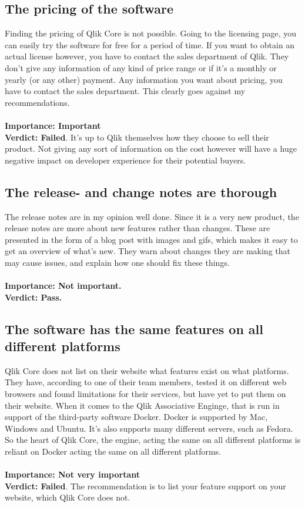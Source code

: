 \documentclass{cslthse-msc}
\begin{document}
    \subsection{The pricing of the software}
    Finding the pricing of Qlik Core is not possible. Going to the licensing page, you can easily try the software for free for a period of time. If you want to obtain an actual license however, you have to contact the sales department of Qlik. They don't give any information of any kind of price range or if it's a monthly or yearly (or any other) payment. Any information you want about pricing, you have to contact the sales department. This clearly goes against my recommendations.\\ \\
    \textbf{Importance: Important}\\
    \textbf{Verdict: Failed}. It's up to Qlik themselves how they choose to sell their product. Not giving any sort of information on the cost however will have a huge negative impact on developer experience for their potential buyers.
    \subsection{The release- and change notes are thorough}
    The release notes are in my opinion well done. Since it is a very new product, the release notes are more about new features rather than changes. These are presented in the form of a blog post with images and gifs, which makes it easy to get an overview of what's new. They warn about changes they are making that may cause issues, and explain how one should fix these things.\\ \\
    \textbf{Importance: Not important.}\\
    \textbf{Verdict: Pass.}
    \subsection{The software has the same features on all different platforms}\label{features}
    Qlik Core does not list on their website what features exist on what platforms. They have, according to one of their team members, tested it on different web browsers and found limitations for their services, but have yet to put them on their website. When it comes to the Qlik Associative Enginge, that is run in support of the third-party software Docker. Docker is supported by Mac, Windows and Ubuntu. It's also supports many different servers, such as Fedora. So the heart of Qlik Core, the engine, acting the same on all different platforms is reliant on Docker acting the same on all different platforms.\\\\
    \textbf{Importance: Not very important}\\
    \textbf{Verdict: Failed}. The recommendation is to list your feature support on your website, which Qlik Core does not.
\end{document}
